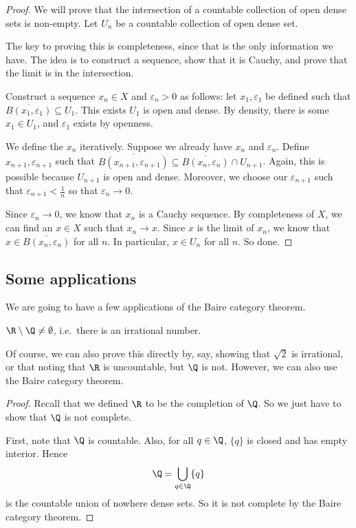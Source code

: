 \documentclass[a4paper]{article}
\begin{document}
\begin{proof}
  We will prove that the intersection of a countable collection of open dense sets is non-empty. Let $U_n$ be a countable collection of open dense set.

  The key to proving this is completeness, since that is the only information we have. The idea is to construct a sequence, show that it is Cauchy, and prove that the limit is in the intersection.

  Construct a sequence $x_n \in X$ and $\varepsilon_n > 0$ as follows: let $x_1, \varepsilon_1$ be defined such that $\overline{B(x_1, \varepsilon_1)} \subseteq U_1$. This exists $U_1$ is open and dense. By density, there is some $x_1 \in U_1$, and $\varepsilon_1$ exists by openness.

  We define the $x_n$ iteratively. Suppose we already have $x_n$ and $\varepsilon_n$. Define $x_{n + 1}, \varepsilon_{n + 1}$ such that $\overline{B(x_{n + 1}, \varepsilon_{n + 1})} \subseteq \overline{B(x_n, \varepsilon_n)}\cap U_{n + 1}$. Again, this is possible because $U_{n + 1}$ is open and dense. Moreover, we choose our $\varepsilon_{n + 1}$ such that $\varepsilon_{n + 1} < \frac{1}{n}$ so that $\varepsilon_n \to 0$.

  Since $\varepsilon_n \to 0$, we know that $x_n$ is a Cauchy sequence. By completeness of $X$, we can find an $x\in X$ such that $x_n \to x$. Since $x$ is the limit of $x_n$, we know that $x\in \overline{B(x_n, \varepsilon_n)}$ for all $n$. In particular, $x\in U_n$ for all $n$. So done.
\end{proof}

\subsection{Some applications}
We are going to have a few applications of the Baire category theorem.

\begin{prop}
  $\R \setminus \Q \not= \emptyset$, i.e.\ there is an irrational number.
\end{prop}
Of course, we can also prove this directly by, say, showing that $\sqrt{2}$ is irrational, or that noting that $\R$ is uncountable, but $\Q$ is not. However, we can also use the Baire category theorem.

\begin{proof}
  Recall that we defined $\R$ to be the completion of $\Q$. So we just have to show that $\Q$ is not complete.

  First, note that $\Q$ is countable. Also, for all $q \in \Q$, $\{q\}$ is closed and has empty interior. Hence
  \[
    \Q = \bigcup_{q \in \Q}\{q\}
  \]
  is the countable union of nowhere dense sets. So it is not complete by the Baire category theorem.
\end{proof}
\end{document}
